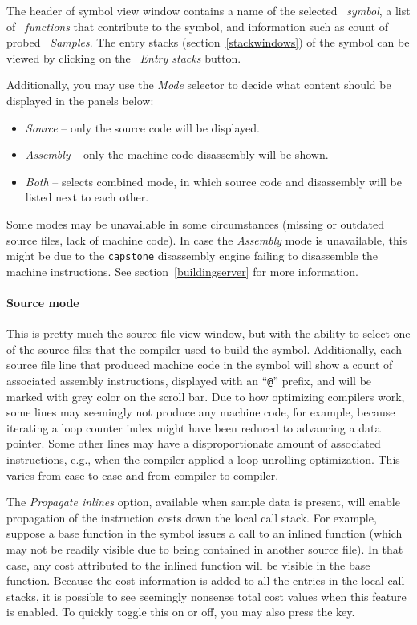\documentclass[hidelinks,titlepage,a4paper,twoside]{article}
\begin{document}
The header of symbol view window contains a name of the selected \emph{\faPuzzlePiece{}~symbol}, a list of \emph{\faSitemap{}~functions} that contribute to the symbol, and information such as count of probed \emph{\faEyeDropper{}~Samples}. The entry stacks (section~\ref{stackwindows}) of the symbol can be viewed by clicking on the \emph{\faArrowDownShortWide{}~Entry stacks} button.

Additionally, you may use the \emph{Mode} selector to decide what content should be displayed in the panels below:

\begin{itemize}
\item \emph{Source} -- only the source code will be displayed.
\item \emph{Assembly} -- only the machine code disassembly will be shown.
\item \emph{Both} -- selects combined mode, in which source code and disassembly will be listed next to each other.
\end{itemize}

Some modes may be unavailable in some circumstances (missing or outdated source files, lack of machine code). In case the \emph{Assembly} mode is unavailable, this might be due to the \texttt{capstone} disassembly engine failing to disassemble the machine instructions. See section~\ref{buildingserver} for more information.

\paragraph{Source mode}

This is pretty much the source file view window, but with the ability to select one of the source files that the compiler used to build the symbol. Additionally, each source file line that produced machine code in the symbol will show a count of associated assembly instructions, displayed with an \enquote{\texttt{@}} prefix, and will be marked with grey color on the scroll bar. Due to how optimizing compilers work, some lines may seemingly not produce any machine code, for example, because iterating a loop counter index might have been reduced to advancing a data pointer. Some other lines may have a disproportionate amount of associated instructions, e.g., when the compiler applied a loop unrolling optimization. This varies from case to case and from compiler to compiler.

The \emph{Propagate inlines} option, available when sample data is present, will enable propagation of the instruction costs down the local call stack. For example, suppose a base function in the symbol issues a call to an inlined function (which may not be readily visible due to being contained in another source file). In that case, any cost attributed to the inlined function will be visible in the base function. Because the cost information is added to all the entries in the local call stacks, it is possible to see seemingly nonsense total cost values when this feature is enabled. To quickly toggle this on or off, you may also press the  key.
\end{document}

